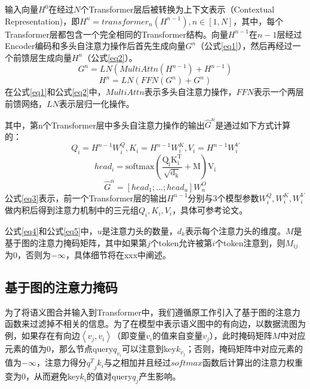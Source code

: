 输入向量$H^0$在经过$N$个Transformer层后被转换为上下文表示（Contextual Representation)，即$H^n=transformer_n(H^{n-1}),n\in[1,N]$，其中，每个Transformer层都包含一个完全相同的Transformer结构。向量$H^{n-1}$在$n-1$层经过Encoder编码和多头自注意力操作\cite{attention}后首先生成向量$G^n$（公式\eqref{eq1}），然后再经过一个前馈层生成向量$H^n$（公式\eqref{eq2}）。
\begin{equation}
    G^n=LN(MultiAttn(H^{n-1})+H^{n-1}) \label{eq1}
\end{equation}
\begin{equation}
H^n=LN(FFN(G^n)+G^n) \label{eq2}
\end{equation}
在公式\eqref{eq1}和公式\eqref{eq2}中，$MultiAttn$表示多头自注意力操作，$FFN$表示一个两层前馈网络，$LN$表示层归一化操作。

其中，第n个Transformer层中多头自注意力操作的输出$\hat{G}^n$是通过如下方式计算的：
\begin{equation}
Q_i=H^{n-1}W_i^Q, K_i=H^{n-1}W_i^K, V_i=H^{n-1}W_i^V \label{eq3}
\end{equation}
\begin{equation}
head_i=\text{softmax}(\frac{\mathrm{Q_iK_i^T}}{\sqrt{\mathrm{d_k}}}+\mathrm{M})\mathrm{V_i} \label{eq4}
\end{equation}
\begin{equation}
\hat{G}^n=[head_1;...;head_u]W_n^O \label{eq5}
\end{equation}
公式\eqref{eq3}表示，前一个Transformer层的输出$H^{n-1}$分别与3个模型参数$W_i^Q,W_i^K,W_i^V$做内积后得到注意力机制中的三元组$Q_i,K_i,V_i$，具体可参考论文\cite{attention}。

公式\eqref{eq4}和公式\eqref{eq5}中，$u$是注意力头的数量，$d_k$表示每个注意力头的维度。$M$是基于图的注意力掩码矩阵，其中如果第$j$个token允许被第$i$个token注意到，则$M_{ij}$为0，否则为$-\infty$，具体细节将在xxx中阐述。



\subsection{基于图的注意力掩码}
\label{sec:基于图的注意力掩码}
为了将语义图合并输入到Transformer中，我们遵循原工作\cite{guo2020graphcodebert}引入了基于图的注意力函数来过滤掉不相关的信息。为了在模型中表示语义图中的有向边，以数据流图为例，如果存在有向边$\left\langle v_j,v_i \right\rangle$（即变量$v_i$的值来自变量$v_j$），此时掩码矩阵$M$中对应元素的值为0，那么节点query$q_{v_i}$可以注意到key$k_{v_j}$；否则，掩码矩阵中对应元素的值为$-\infty$，注意力得分${q^T}_jk_i$与之相加并且经过$softmax$函数后计算出的注意力权重变为0，从而避免key$k_i$的值对query$q_j$产生影响。%

